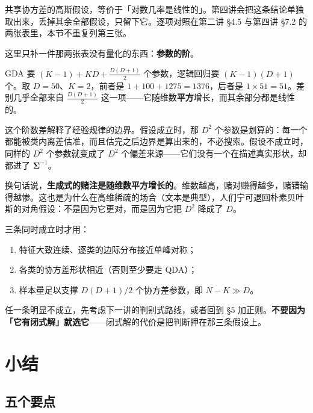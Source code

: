\documentclass[11pt,a4paper,fontset=windows,zihao=-4]{ctexart}
\newcommand{\bSigma}{\boldsymbol{\Sigma}}
\begin{document}
共享协方差的高斯假设，等价于「对数几率是线性的」。第四讲会把这条结论单独取出来，丢掉其余全部假设，只留下它。逐项对照在第二讲 \S4.5 与第四讲 \S7.2 的两张表里，本节不重复列第三张。

这里只补一件那两张表没有量化的东西：\textbf{参数的阶}。

GDA 要 $(K-1)+KD+\frac{D(D+1)}{2}$ 个参数，逻辑回归要 $(K-1)(D+1)$ 个。取 $D=50$、$K=2$，前者是 $1+100+1275=1376$，后者是 $1\times 51=51$。差别几乎全部来自 $\frac{D(D+1)}{2}$ 这一项——它随维数\textbf{平方}增长，而其余部分都是线性的。

这个阶数差解释了经验规律的边界。假设成立时，那 $D^2$ 个参数是划算的：每一个都能被类内离差估准，而且估完之后边界是算出来的，不必搜索。假设不成立时，同样的 $D^2$ 个参数就变成了 $D^2$ 个偏差来源——它们没有一个在描述真实形状，却都进了 $\bSigma^{-1}$。

换句话说，\textbf{生成式的赌注是随维数平方增长的}。维数越高，赌对赚得越多，赌错输得越惨。这也是为什么在高维稀疏的场合（文本是典型），人们宁可退回朴素贝叶斯的对角假设：不是因为它更对，而是因为它把 $D^2$ 降成了 $D$。

\begin{keybox}
三条同时成立时才用：
\begin{enumerate}[label=\textcolor{navy}{\bfseries(\arabic*)},leftmargin=2.2em]
  \item 特征大致连续、逐类的边际分布接近单峰对称；
  \item 各类的协方差形状相近（否则至少要走 QDA）；
  \item 样本量足以支撑 $D(D+1)/2$ 个协方差参数，即 $N-K\gg D$。
\end{enumerate}

任一条明显不成立，先考虑下一讲的判别式路线，或者回到 §5 加正则。\textbf{不要因为「它有闭式解」就选它}——闭式解的代价是把判断押在那三条假设上。
\end{keybox}


\section{小结}

\subsection{五个要点}
\end{document}

